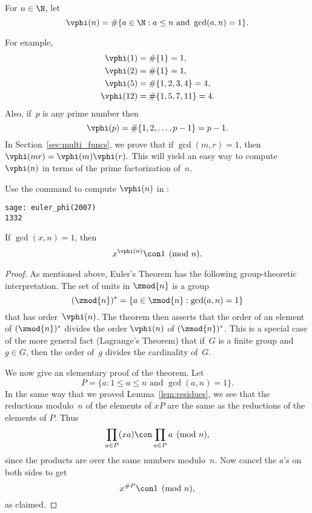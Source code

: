 \begin{definition}\label{def:phi}
For $n\in\N$, let
$$
 \vphi(n) = \#\{a \in \N : a \leq n \text{ and } \gcd(a,n)=1\}.
$$
\end{definition}
For example,
\begin{align*}
 \vphi(1) &= \#\{1\} = 1,\\
 \vphi(2) &= \#\{1\} = 1,\\
 \vphi(5) &= \#\{1,2,3,4\} = 4,\\
 \vphi(12) &= \#\{1,5,7,11\} = 4.\\
\end{align*}
Also, if~$p$ is any prime number then
$$
   \vphi(p) = \#\{1,2,\ldots,p-1\} = p-1.
$$
In Section~\ref{sec:multi_funcs}, we prove
that if $\gcd(m,r)=1$, then $\vphi(mr)=\vphi(m)\vphi(r).$  This will
yield an easy way to compute $\vphi(n)$ in terms of the prime
factorization of~$n$.
\begin{sg}
Use the  command to compute $\vphi(n)$
in \sage:
\begin{verbatim}
sage: euler_phi(2007)
1332
\end{verbatim}
\end{sg}

\begin{theorem}\label{thm:fermatlittle}
If $\gcd(x,n)=1$, then
$$
   x^{\vphi(n)} \con 1\pmod{n}.
$$
\end{theorem}
\begin{proof}
As mentioned above, Euler's Theorem has the following group-theoretic
interpretation.  The set of units in $\zmod{n}$ is a group
$$
(\zmod{n})^*
= \{ a \in \zmod{n} : \gcd(a,n) = 1\}
$$
that has order~$\vphi(n)$.  The theorem then asserts
that the order of an element of $(\zmod{n})^*$ divides the order
$\vphi(n)$ of $(\zmod{n})^*$.   This is a special case of the more
general fact (Lagrange's Theorem) that if~$G$ is a finite group and
$g\in G$, then the order of~$g$ divides the cardinality of~$G$.

We now give an elementary proof of the theorem.  Let
$$
  P = \{ a : 1\leq a \leq n \text{ and } \gcd(a,n) = 1\}.
$$
In the same way that we proved Lemma~\ref{lem:residues},
we see that the reductions modulo~$n$ of the elements of $xP$
are the same as the reductions of the elements of $P$.
Thus
$$
 \prod_{a\in P} (xa) \con \prod_{a \in P} a \pmod{n},
$$
since the products are over the same numbers modulo~$n$.
Now cancel the $a$'s on both sides to get
$$x^{\#P} \con 1\pmod{n},$$
as claimed.
\end{proof}


